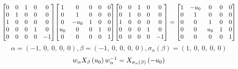 \documentclass[11pt]{article}
\theoremstyle{definition}
\begin{document}
\[
\scaletoalign{\textwidth}{{\left[\begin{matrix}0 & 0 & 1 & 0 & 0\\0 & 1 & 0 & 0 & 0\\1 & 0 & 0 & 0 & 0\\0 & 0 & 0 & 1 & 0\\0 & 0 & 0 & 0 & -1\end{matrix}\right]} {\left[\begin{matrix}1 & 0 & 0 & 0 & 0\\0 & 1 & 0 & 0 & 0\\0 & - u_{0} & 1 & 0 & 0\\u_{0} & 0 & 0 & 1 & 0\\0 & 0 & 0 & 0 & 1\end{matrix}\right]} {\left[\begin{matrix}0 & 0 & 1 & 0 & 0\\0 & 1 & 0 & 0 & 0\\1 & 0 & 0 & 0 & 0\\0 & 0 & 0 & 1 & 0\\0 & 0 & 0 & 0 & -1\end{matrix}\right]} = {\left[\begin{matrix}1 & - u_{0} & 0 & 0 & 0\\0 & 1 & 0 & 0 & 0\\0 & 0 & 1 & 0 & 0\\0 & 0 & u_{0} & 1 & 0\\0 & 0 & 0 & 0 & 1\end{matrix}\right]}}
\]
\[
\alpha = \left( -1, \  0, \  0, \  0, \  0\right), \beta = \left( -1, \  0, \  0, \  0, \  0\right), \sigma_{\alpha}(\beta) = \left( 1, \  0, \  0, \  0, \  0\right)
\]
\[
\scaletoalign{\textwidth}{w_{\alpha} X_{\beta}\left(u_{0}\right) w_{\alpha}^{-1} = X_{\sigma_{\alpha}\left(\beta\right)}\left(- u_{0}\right)}
\]
\end{document}
